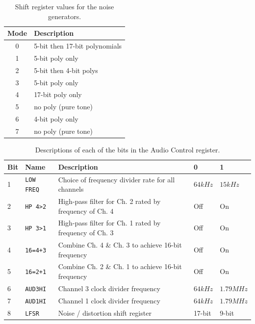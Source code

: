 \documentclass[12pt,a4paper]{article}
\begin{document}
\begin{table}[!htp]
\centering
\caption{Shift register values for the noise generators.}
\label{tab:shift-register}
\small
\begin{tabular}{|c||l|}
\hline
Mode & Description                   \\
\hline\hline
 0    & 5-bit then 17-bit polynomials \\
 1    & 5-bit poly only               \\
 2    & 5-bit then 4-bit polys        \\
 3    & 5-bit poly only               \\
 4    & 17-bit poly only              \\
 5    & no poly (pure tone)           \\
 6    & 4-bit poly only               \\
 7    & no poly (pure tone)           \\
\hline
\end{tabular}
\end{table}

\begin{table}[!htp]
\centering
\caption{Descriptions of each of the bits in the Audio Control register.}
\label{tab:audio-control}
\small
\begin{tabular}{|l|l||l|l|l|}
\hline
 Bit & Name              & Description                                            & 0        & 1          \\
\hline\hline
 1   & \texttt{LOW FREQ} & Choice of frequency divider rate for all channels      & $64 kHz$ & $15 kHz$   \\
 2   & \texttt{HP 4>2}   & High-pass filter for Ch. 2 rated by frequency of Ch. 4 & Off      & On         \\
 3   & \texttt{HP 3>1}   & High-pass filter for Ch. 1 rated by frequency of Ch. 3 & Off      & On         \\
 4   & \texttt{16=4+3}   & Combine Ch. 4 \& Ch. 3 to achieve 16-bit frequency     & Off      & On         \\
 5   & \texttt{16=2+1}   & Combine Ch. 2 \& Ch. 1 to achieve 16-bit frequency     & Off      & On         \\
 6   & \texttt{AUD3HI}   & Channel 3 clock divider frequency                      & $64 kHz$ & $1.79 MHz$ \\
 7   & \texttt{AUD1HI}   & Channel 1 clock divider frequency                      & $64 kHz$ & $1.79 MHz$ \\
 8   & \texttt{LFSR}     & Noise / distortion shift register                      & 17-bit   & 9-bit      \\
\hline
\end{tabular}
\end{table}


\clearpage
\renewcommand\refname{References \& Acknowledgments}
\nocite{*}


\end{document}
